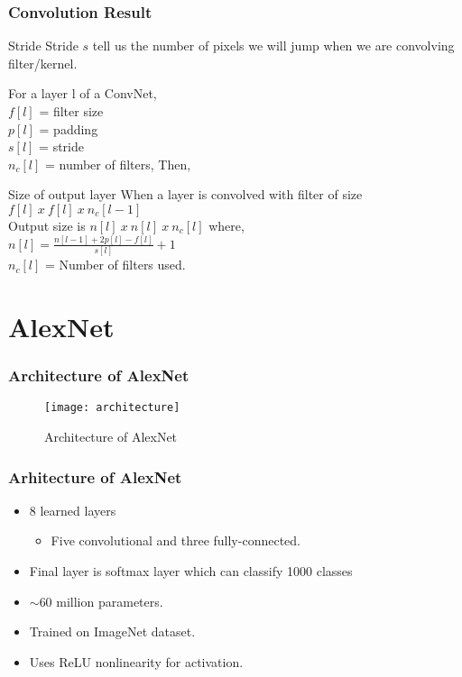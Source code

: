 \documentclass[aspectratio=169, 10pt]{beamer}
\begin{document}
\begin{frame}
	\frametitle{Convolution Result}
	
	\begin{block}{Stride}
		Stride $s$ tell us the number of pixels we will jump when we are convolving filter/kernel.
	\end{block}
	For a layer l of a ConvNet,\\
	$f[l]$ = filter size\\
	$p[l]$ = padding\\
	$s[l]$ = stride\\
	$n_{c}[l]$ = number of filters, Then,\\
	\vspace{8pt}
	\begin{block}{Size of output layer}
		When a layer is convolved with filter of size $\displaystyle f[l]\ x\ f[l]\ x\ n_c[l-1]$\\
		Output size is $n[l]\ x\ n[l]\ x\ n_c[l]$ where,\\
		\vspace{6pt}
		$n[l] = \displaystyle \frac{n[l-1] + 2p[l] - f[l]}{s[l]} + 1$\\
		\vspace{6pt}
		$n_c[l]$ = Number of filters used.
		
		
	\end{block}

\end{frame}

\section{AlexNet}

\begin{frame}
	\frametitle{Architecture of AlexNet}
	
	\begin{figure}
	\centering
	\texttt{[image: architecture]}
	\caption{Architecture of AlexNet}
	\end{figure}

\end{frame}

\begin{frame}
	\frametitle{Arhitecture of AlexNet}
	
	\begin{itemize}
		\item 8 learned layers
		\begin{itemize}
			\item Five convolutional and three fully-connected.
		\end{itemize}
		\item Final layer is softmax layer which can classify 1000 classes
		\item $\sim 60$ million parameters.
		\item Trained on ImageNet dataset.
		\item Uses ReLU nonlinearity for activation.
	\end{itemize}

\end{frame}
\end{document}

